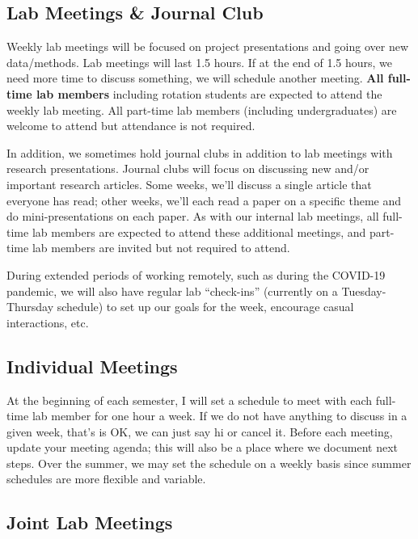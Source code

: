 \documentclass[
]{book}
\begin{document}
\hypertarget{lab-meetings-journal-club}{%
\subsection{Lab Meetings \& Journal Club}\label{lab-meetings-journal-club}}

Weekly lab meetings will be focused on project presentations and going over new data/methods. Lab meetings will last 1.5 hours. If at the end of 1.5 hours, we need more time to discuss something, we will schedule another meeting. \textbf{All full-time lab members} including rotation students are expected to attend the weekly lab meeting. All part-time lab members (including undergraduates) are welcome to attend but attendance is not required.

In addition, we sometimes hold journal clubs in addition to lab meetings with research presentations. Journal clubs will focus on discussing new and/or important research articles. Some weeks, we'll discuss a single article that everyone has read; other weeks, we'll each read a paper on a specific theme and do mini-presentations on each paper. As with our internal lab meetings, all full-time lab members are expected to attend these additional meetings, and part-time lab members are invited but not required to attend.

During extended periods of working remotely, such as during the COVID-19 pandemic, we will also have regular lab ``check-ins'' (currently on a Tuesday-Thursday schedule) to set up our goals for the week, encourage casual interactions, etc.

\hypertarget{individual-meetings}{%
\subsection{Individual Meetings}\label{individual-meetings}}

At the beginning of each semester, I will set a schedule to meet with each full-time lab member for one hour a week. If we do not have anything to discuss in a given week, that's is OK, we can just say hi or cancel it. Before each meeting, update your meeting agenda; this will also be a place where we document next steps. Over the summer, we may set the schedule on a weekly basis since summer schedules are more flexible and variable.

\hypertarget{joint-lab-meetings}{%
\subsection{Joint Lab Meetings}\label{joint-lab-meetings}}
\end{document}
